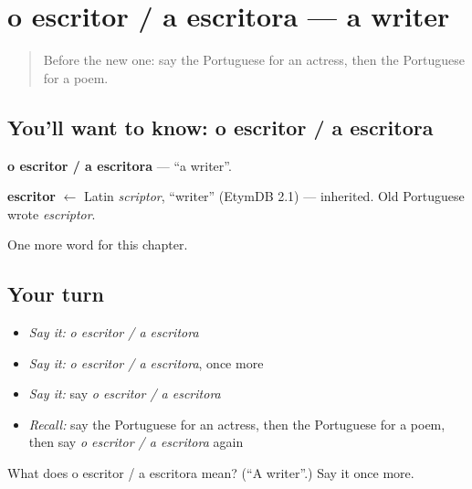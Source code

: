 \section[o escritor / a escritora]{o escritor / a escritora — a writer}

\label{lesson:PT-C190-escritor-a-escritora}



\begin{quote}
Before the new one: say the Portuguese for an actress, then the Portuguese for a poem.
\end{quote}

\subsection*{You'll want to know: o escritor / a escritora}
\textbf{o escritor / a escritora} — \textquotedblleft{}a writer\textquotedblright{}.

\begin{cousinweb}
\textbf{escritor} $\leftarrow$ Latin \emph{scriptor}, \textquotedblleft{}writer\textquotedblright{} (EtymDB 2.1) — inherited. Old Portuguese wrote \emph{escriptor}.
\end{cousinweb}

\begin{grammarlens}[title={What you've built}]
One more word for this chapter.
\end{grammarlens}

\subsection*{Your turn}
\begin{itemize}
\raggedright
  \item \emph{Say it:} \emph{o escritor / a escritora}
  \item \emph{Say it:} \emph{o escritor / a escritora}, once more
  \item \emph{Say it:} say \emph{o escritor / a escritora}
  \item \emph{Recall:} say the Portuguese for an actress, then the Portuguese for a poem, then say \emph{o escritor / a escritora} again
\end{itemize}

\begin{tcolorbox}[breakable,colback=teal!4,colframe=teal!35!black,title={Before you move on}]
What does o escritor / a escritora mean? (\textquotedblleft{}A writer\textquotedblright{}.) Say it once more.
\end{tcolorbox}
